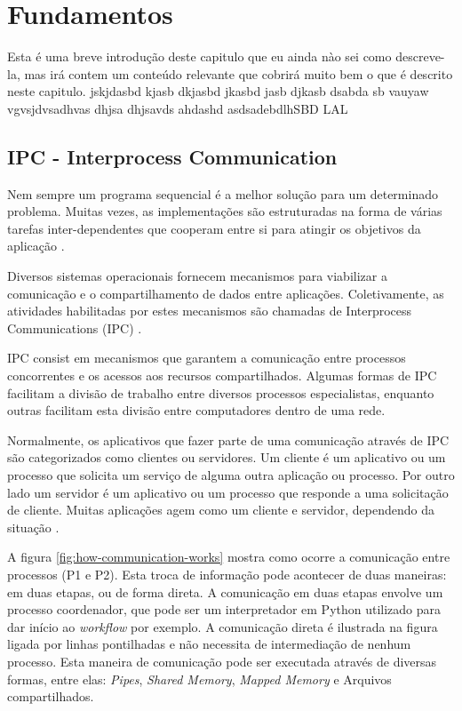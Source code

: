 \chapter[Fundamentos]{Fundamentos}

Esta é uma breve introdução deste capitulo que eu ainda nào sei como descreve-la, mas irá contem um conteúdo relevante que cobrirá muito bem o que é descrito neste capitulo. jskjdasbd kjasb dkjasbd jkasbd jasb djkasb dsabda sb vauyaw vgvsjdvsadhvas dhjsa dhjsavds ahdashd asdsadebdlhSBD LAL


\section{IPC - Interprocess Communication}\label{sec:ipc}

Nem sempre um programa sequencial é a melhor solução para um determinado problema. Muitas vezes, as implementações são estruturadas na forma de várias tarefas inter-dependentes que cooperam entre si para atingir os objetivos da aplicação \cite{sistemas-op-mazierro}.

Diversos sistemas operacionais fornecem mecanismos para viabilizar a comunicação e o compartilhamento de dados entre aplicações. Coletivamente, as atividades habilitadas por estes mecanismos são chamadas de Interprocess Communications (IPC) \cite{microsoft-ipc}.

IPC consist em mecanismos que garantem a comunicação entre processos concorrentes e os acessos aos recursos compartilhados. Algumas formas de IPC facilitam a divisão de trabalho entre diversos processos especialistas, enquanto outras facilitam esta divisão entre computadores dentro de uma rede.

Normalmente, os aplicativos que fazer parte de uma comunicação através de IPC são categorizados como clientes ou servidores. Um cliente é um aplicativo ou um processo que solicita um serviço de alguma outra aplicação ou processo. Por outro lado um servidor é um aplicativo ou um processo que responde a uma solicitação de cliente. Muitas aplicações agem como um cliente e servidor, dependendo da situação \cite{microsoft-ipc}.

A figura \ref{fig:how-communication-works} mostra como ocorre a comunicação entre processos (P1 e P2). Esta troca de informação pode acontecer de duas maneiras: em duas etapas, ou de forma direta. A comunicação em duas etapas envolve um processo coordenador, que pode ser um interpretador em Python utilizado para dar início ao \textit{workflow} por exemplo. A comunicação direta é ilustrada na figura ligada por linhas pontilhadas e não necessita de intermediação de nenhum processo. Esta maneira de comunicação pode ser executada através de diversas formas, entre elas: \textit{Pipes}, \textit{Shared Memory}, \textit{Mapped Memory} e Arquivos compartilhados.

